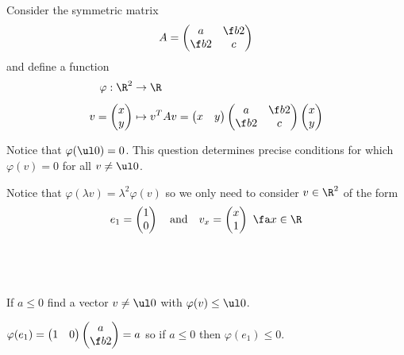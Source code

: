 \documentclass[a4paper]{article}
\begin{document}
\begin{questionbody}
Consider the symmetric matrix $$A = \begin{pmatrix} a & \f b2 \\ \f b2 & c \end{pmatrix}$$
and define a function \begin{align*}
\varphi : \R^2 &\to \R\\[1ex]
v = \begin{pmatrix} x \\ y \end{pmatrix} &\mapsto v^T A v = \begin{pmatrix} x & y \end{pmatrix} \begin{pmatrix} a & \f b2 \\ \f b2 & c \end{pmatrix} \begin{pmatrix} x \\ y \end{pmatrix}
\end{align*}

Notice that $\varphi(\ul 0) = 0$. This question determines precise conditions for which $\varphi(v) = 0$ for all $v \ne \ul 0$.

Notice that $\varphi(\lambda v) = \lambda^2 \varphi(v)$ so we only need to consider $v \in \R^2$ of the form $$e_1 = \begin{pmatrix} 1 \\ 0 \end{pmatrix} \quad\text{and}\quad v_x = \begin{pmatrix} x \\ 1 \end{pmatrix}\ \fa x \in \R$$
\end{questionbody}

\subsection{~} %

\begin{questionbody}
If $a \le 0$ find a vector $v \ne \ul 0$ with $\varphi(v) \le \ul 0$.
\end{questionbody}

$\varphi(e_1) = \begin{pmatrix}1 & 0\end{pmatrix} \begin{pmatrix}a \\ \f b2\end{pmatrix} = a$ so if $a \le 0$ then $\varphi(e_1) \le 0$.
\end{document}
